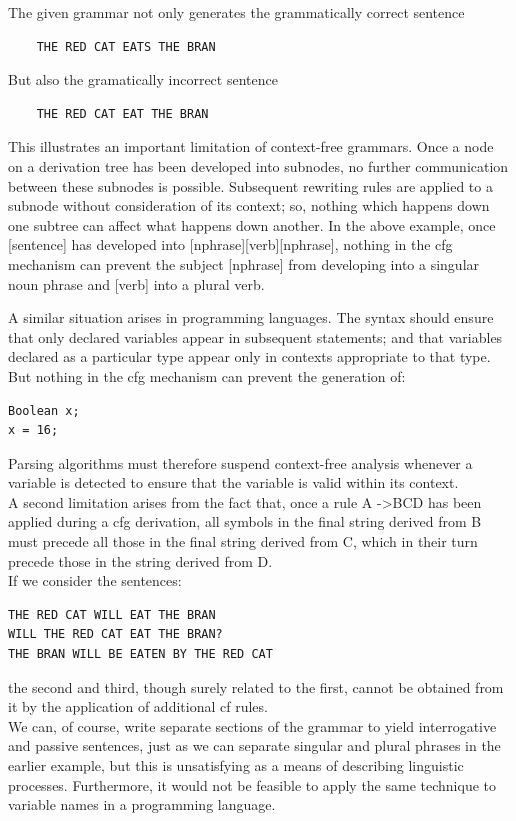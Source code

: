 \documentclass[12pt]{article}
\begin{document}
The given grammar not only generates the grammatically correct sentence
\begin{verbatim}
    THE RED CAT EATS THE BRAN
\end{verbatim}
But also the gramatically incorrect sentence
\begin{verbatim}
    THE RED CAT EAT THE BRAN
\end{verbatim}
This illustrates an important limitation of context-free grammars. Once a node on a derivation tree has been developed into subnodes, no further communication between these subnodes is possible. Subsequent rewriting rules are applied to a subnode without consideration of its context; so, nothing which happens down one subtree can affect what happens down another. In the above example, once [sentence] has developed into [nphrase][verb][nphrase], nothing in the cfg mechanism can prevent the subject [nphrase] from developing into a singular noun phrase and [verb] into a plural verb.
\par
A similar situation arises in programming languages. The syntax should ensure that only declared variables appear in subsequent statements; and that variables declared as a particular type appear only in contexts appropriate to that type. But nothing in the cfg mechanism can prevent the generation of:
\begin{verbatim}
Boolean x;
x = 16;
\end{verbatim}
Parsing algorithms must therefore suspend context-free analysis whenever a variable is detected to ensure that the variable is valid within its context.
\\
A second limitation arises from the fact that, once a rule A -\textgreater BCD has been applied during a cfg derivation, all symbols in the final string derived from B must precede all those in the final string derived from C, which in their turn precede those in the string derived from D.
\\
If we consider the sentences:
\begin{verbatim}
THE RED CAT WILL EAT THE BRAN
WILL THE RED CAT EAT THE BRAN?
THE BRAN WILL BE EATEN BY THE RED CAT
\end{verbatim}
the second and third, though surely related to the first, cannot be obtained from it by the application of additional cf rules.
\\
We can, of course, write separate sections of the grammar to yield interrogative and passive sentences, just as we can separate singular and plural phrases in the earlier example, but this is unsatisfying as a means of describing linguistic processes. Furthermore, it would not be feasible to apply the same technique to variable names in a programming language.
\end{document}
